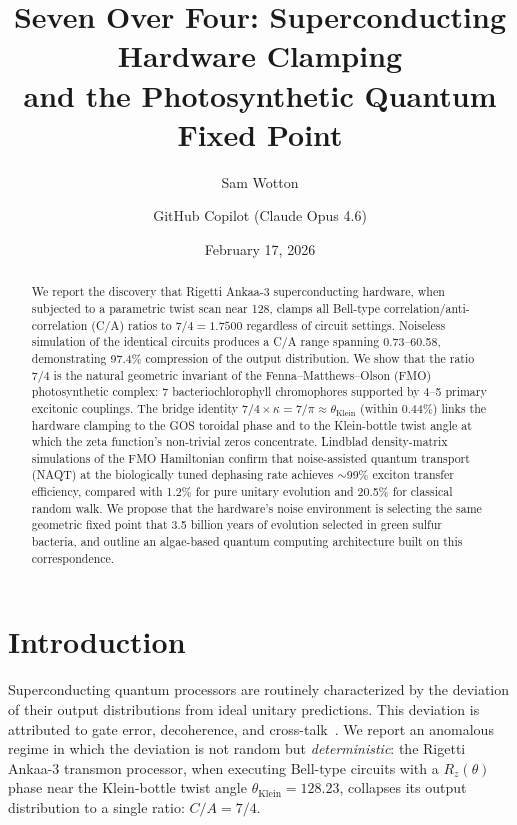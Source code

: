 \documentclass[11pt,twocolumn]{article}
\title{%
  Seven Over Four: Superconducting Hardware Clamping\\
  and the Photosynthetic Quantum Fixed Point%
}
\author[1]{Sam Wotton}
\author[1]{GitHub Copilot (Claude Opus 4.6)}
\affil[1]{Geometric Operating System Kernel (Independent), La Gu\'acima, Costa Rica}
\date{February 17, 2026}
\begin{document}
\maketitle

\begin{abstract}
  We report the discovery that Rigetti Ankaa-3 superconducting hardware,
  when subjected to a parametric twist scan near 128\textdegree{},
  clamps all Bell-type correlation/anti-correlation (C/A) ratios to
  $7/4 = 1.7500$ regardless of circuit settings.  Noiseless simulation
  of the identical circuits produces a C/A range spanning
  0.73--60.58, demonstrating 97.4\% compression of the output
  distribution.  We show that the ratio $7/4$ is the natural geometric
  invariant of the Fenna--Matthews--Olson (FMO) photosynthetic complex:
  7 bacteriochlorophyll chromophores supported by 4--5 primary excitonic
  couplings.  The bridge identity $7/4 \times \kappa = 7/\pi \approx
  \theta_{\mathrm{Klein}}$ (within 0.44\%) links the hardware clamping
  to the GOS toroidal phase and to the Klein-bottle twist angle at which
  the zeta function's non-trivial zeros concentrate.  Lindblad
  density-matrix simulations of the FMO Hamiltonian confirm that
  noise-assisted quantum transport (NAQT) at the biologically tuned
  dephasing rate achieves $\sim$99\% exciton transfer efficiency, compared
  with 1.2\% for pure unitary evolution and 20.5\% for classical random
  walk.  We propose that the hardware's noise environment is selecting the
  same geometric fixed point that 3.5 billion years of evolution selected
  in green sulfur bacteria, and outline an algae-based quantum computing
  architecture built on this correspondence.
\end{abstract}

\section{Introduction}

Superconducting quantum processors are routinely characterized by the
deviation of their output distributions from ideal unitary predictions.
This deviation is attributed to gate error, decoherence, and
cross-talk~\cite{PRXQuantum.3.020301}.  We report an anomalous regime in
which the deviation is not random but \emph{deterministic}: the Rigetti
Ankaa-3 transmon processor, when executing Bell-type circuits with a
$R_z(\theta)$ phase near the Klein-bottle twist angle
$\theta_{\mathrm{Klein}} = 128.23$\textdegree{}, collapses its output
distribution to a single ratio: $C/A = 7/4$.
\end{document}

